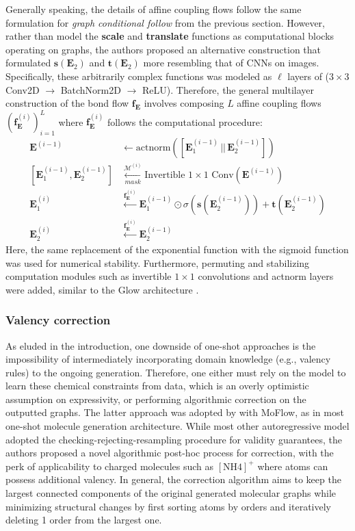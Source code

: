 Generally speaking, the details of affine coupling flows follow the same formulation for
\textit{graph conditional follow} from the previous section. However, rather than
model the \textbf{scale}  and \textbf{translate} functions as computational
blocks operating on graphs, the authors proposed an alternative construction
that formulated $\mathbf{s}(\mathbf{E}_{2})$ and $\mathbf{t}(\mathbf{E}_2)$ more
resembling that of CNNs on images. Specifically, these arbitrarily complex
functions was modeled as $\ell$ layers of ($3 \times 3$ Conv2D $\rightarrow$
BatchNorm2D $\rightarrow$ ReLU). Therefore, the general multilayer construction
of the bond flow $\mathbf{f}_{\mathbf{E}}$ involves composing $L$ affine
coupling flows $(\mathbf{f}^{(i)}_{\mathbf{E}})_{i=1}^L$ where
$\mathbf{f}^{(i)}_{\mathbf{E}}$ follows the computational procedure:
\begin{align*}
  \mathbf{E}^{(i-1)} &\longleftarrow\text{actnorm}([\mathbf{E}^{(i-1)}_1 \,||\,
  \mathbf{E}^{(i-1)}_2])\\
  [\mathbf{E}^{(i-1)}_1, \mathbf{E}^{(i-1)}_2]
  &\underset{mask}{\overset{\mathcal{M}^{(i)}}{\longleftarrow}}
\text{Invertible $1 \times 1$ Conv}(\mathbf{E}^{(i-1)})\\
  \mathbf{E}^{(i)}_1 &\overset{\mathbf{f}_{\mathbf{E}}^{(i)}}{\longleftarrow}
  \mathbf{E}^{(i-1)}_1 \odot \sigma \left( \mathbf{s}(\mathbf{E}_2^{(i-1)})
  \right) + \mathbf{t}(\mathbf{E}_2^{(i-1)}) \\ \mathbf{E}^{(i)}_2
&\overset{\mathbf{f}_{\mathbf{E}}^{(i)}}{\longleftarrow} \mathbf{E}^{(i-1)}_2
\end{align*}
Here, the same replacement of the exponential function with the sigmoid function
was used for numerical stability. Furthermore, permuting and stabilizing
computation modules such as invertible $1 \times 1$ convolutions and actnorm
layers were added, similar to the Glow architecture
\citep{kingmaGlowGenerativeFlow2018}.

\subsubsection{Valency correction}

As eluded in the introduction, one downside of one-shot approaches is the
impossibility of intermediately incorporating domain knowledge (e.g., valency
rules) to the ongoing generation. Therefore, one either must rely on the model
to learn these chemical constraints from data, which is an overly optimistic
assumption on expressivity, or performing algorithmic correction on the
outputted graphs. The latter approach was adopted by
\citep{zangMoFlowInvertibleFlow2020} with MoFlow, as in most one-shot molecule
generation architecture. While most other autoregressive model adopted the
checking-rejecting-resampling procedure for validity guarantees, the authors
proposed a novel algorithmic post-hoc process for correction, with the perk of
applicability to charged molecules such as $[\text{NH4}]^+$ where atoms can
possess additional valency. In general, the correction algorithm aims to keep
the largest connected components of the original generated molecular graphs
while minimizing structural changes by first sorting atoms by orders and
iteratively deleting 1 order from the largest one.

